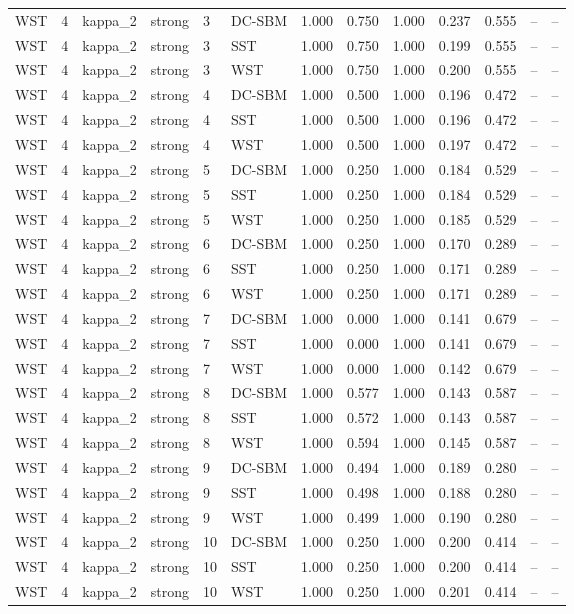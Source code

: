 \begin{table}[!h]
\begin{tabular}[t]{lllllllllllll}
WST & 4 & kappa_2 & strong & 3 & DC-SBM & 1.000 & 0.750 & 1.000 & 0.237 & 0.555 & -- & --\\
WST & 4 & kappa_2 & strong & 3 & SST & 1.000 & 0.750 & 1.000 & 0.199 & 0.555 & -- & --\\
WST & 4 & kappa_2 & strong & 3 & WST & 1.000 & 0.750 & 1.000 & 0.200 & 0.555 & -- & --\\
WST & 4 & kappa_2 & strong & 4 & DC-SBM & 1.000 & 0.500 & 1.000 & 0.196 & 0.472 & -- & --\\
WST & 4 & kappa_2 & strong & 4 & SST & 1.000 & 0.500 & 1.000 & 0.196 & 0.472 & -- & --\\
WST & 4 & kappa_2 & strong & 4 & WST & 1.000 & 0.500 & 1.000 & 0.197 & 0.472 & -- & --\\
WST & 4 & kappa_2 & strong & 5 & DC-SBM & 1.000 & 0.250 & 1.000 & 0.184 & 0.529 & -- & --\\
WST & 4 & kappa_2 & strong & 5 & SST & 1.000 & 0.250 & 1.000 & 0.184 & 0.529 & -- & --\\
WST & 4 & kappa_2 & strong & 5 & WST & 1.000 & 0.250 & 1.000 & 0.185 & 0.529 & -- & --\\
WST & 4 & kappa_2 & strong & 6 & DC-SBM & 1.000 & 0.250 & 1.000 & 0.170 & 0.289 & -- & --\\
WST & 4 & kappa_2 & strong & 6 & SST & 1.000 & 0.250 & 1.000 & 0.171 & 0.289 & -- & --\\
WST & 4 & kappa_2 & strong & 6 & WST & 1.000 & 0.250 & 1.000 & 0.171 & 0.289 & -- & --\\
WST & 4 & kappa_2 & strong & 7 & DC-SBM & 1.000 & 0.000 & 1.000 & 0.141 & 0.679 & -- & --\\
WST & 4 & kappa_2 & strong & 7 & SST & 1.000 & 0.000 & 1.000 & 0.141 & 0.679 & -- & --\\
WST & 4 & kappa_2 & strong & 7 & WST & 1.000 & 0.000 & 1.000 & 0.142 & 0.679 & -- & --\\
WST & 4 & kappa_2 & strong & 8 & DC-SBM & 1.000 & 0.577 & 1.000 & 0.143 & 0.587 & -- & --\\
WST & 4 & kappa_2 & strong & 8 & SST & 1.000 & 0.572 & 1.000 & 0.143 & 0.587 & -- & --\\
WST & 4 & kappa_2 & strong & 8 & WST & 1.000 & 0.594 & 1.000 & 0.145 & 0.587 & -- & --\\
WST & 4 & kappa_2 & strong & 9 & DC-SBM & 1.000 & 0.494 & 1.000 & 0.189 & 0.280 & -- & --\\
WST & 4 & kappa_2 & strong & 9 & SST & 1.000 & 0.498 & 1.000 & 0.188 & 0.280 & -- & --\\
WST & 4 & kappa_2 & strong & 9 & WST & 1.000 & 0.499 & 1.000 & 0.190 & 0.280 & -- & --\\
WST & 4 & kappa_2 & strong & 10 & DC-SBM & 1.000 & 0.250 & 1.000 & 0.200 & 0.414 & -- & --\\
WST & 4 & kappa_2 & strong & 10 & SST & 1.000 & 0.250 & 1.000 & 0.200 & 0.414 & -- & --\\
WST & 4 & kappa_2 & strong & 10 & WST & 1.000 & 0.250 & 1.000 & 0.201 & 0.414 & -- & --\\
\bottomrule
\end{tabular}
\end{table}
